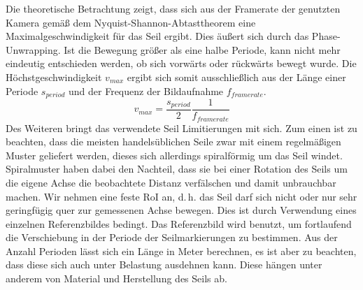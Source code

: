 \documentclass[10pt,a4paper]{scrarticle}
\begin{document}
    Die theoretische Betrachtung zeigt, dass sich aus der Framerate der genutzten Kamera gemäß dem Nyquist-Shannon-Abtasttheorem eine Maximalgeschwindigkeit für das Seil ergibt. Dies äußert sich durch das Phase-Unwrapping. Ist die Bewegung größer als eine halbe Periode, kann nicht mehr eindeutig entschieden werden, ob sich vorwärts oder rückwärts bewegt wurde. Die Höchstgeschwindigkeit $v_{max}$ ergibt sich somit ausschließlich aus der Länge einer Periode $s_{period}$ und der Frequenz der Bildaufnahme $f_{framerate}$.
    \begin{equation}
    v_{max}=\frac{s_{period}}{2}\frac{1}{f_{framerate}}
    \end{equation}
    Des Weiteren bringt das verwendete Seil Limitierungen mit sich. Zum einen ist zu beachten, dass die meisten handelsüblichen Seile zwar mit einem regelmäßigen Muster geliefert werden, dieses sich allerdings spiralförmig um das Seil windet. Spiralmuster haben dabei den Nachteil, dass sie bei einer Rotation des Seils um die eigene Achse die beobachtete Distanz verfälschen und damit unbrauchbar machen. %
    Wir nehmen eine feste RoI an, d.\,h. das Seil darf sich nicht oder nur sehr geringfügig quer zur gemessenen Achse bewegen. Dies ist durch Verwendung eines einzelnen Referenzbildes bedingt. Das Referenzbild wird benutzt, um fortlaufend die Verschiebung in der Periode der Seilmarkierungen zu bestimmen. 
    Aus der Anzahl Perioden lässt sich ein Länge in Meter berechnen, es ist aber zu beachten, dass diese sich auch unter Belastung ausdehnen kann. Diese hängen unter anderem von Material und Herstellung des Seils ab. %
\end{document}
